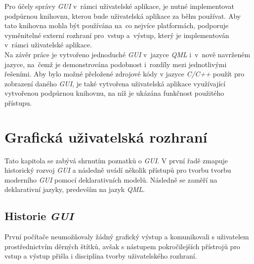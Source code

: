 \documentclass[11pt,twoside,a4paper]{book}
\begin{document}
Pro účely správy \textit{GUI} v~rámci uživatelské aplikace, je nutné implementovat podpůrnou knihovnu, kterou bude uživatelská aplikace za běhu používat. Aby tato knihovna mohla být používána na~co nejvíce platformách, podporuje vyměnitelné externí rozhraní pro~vstup a~výstup, který je implementován v~rámci uživatelské aplikace.\\
Na závěr práce je vytvořeno jednoduché \textit{GUI} v~jazyce \textit{QML} i~v~nově navrženém jazyce, na~čemž je demonstrována podobnost i~rozdíly mezi jednotlivými řešeními. Aby bylo možné přeložené zdrojové kódy v jazyce \textit{C/C++} použít pro zobrazení daného \textit{GUI}, je také vytvořena uživatelská aplikace využívající vytvořenou podpůrnou knihovnu, na níž je ukázána funkčnost použitého přístupu.





\chapter[\textit{GUI}]{\label{CH:Rash}Grafická uživatelská rozhraní}
Tato kapitola se zabývá shrnutím poznatků o \textit{GUI}. V první řadě zmapuje historický rozvoj \textit{GUI} a následně uvádí několik přístupů pro tvorbu tvorbu moderního \textit{GUI} pomocí deklarativních modelů. Následně se zaměří na deklarativní jazyky, predevším na jazyk \textit{QML}.

\section{\label{SEC:history}Historie \textit{GUI}}
První počítače neumožňovaly žádný grafický výstup a komunikovali s uživatelem prostřednictvím děrných štítků, avšak s nástupem pokročilejších přístrojů pro vstup a výstup přišla i disciplína tvorby uživatelského rozhraní.
\end{document}
